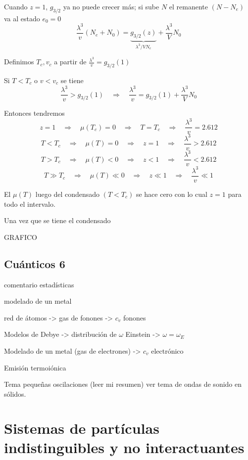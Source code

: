 \documentclass[10pt,oneside]{CBFT_book}
\begin{document}
Cuando $z=1$, $g_{3/2}$  ya no puede crecer más; si sube $N$ el remanente $(N-N_e)$ va al estado 
$e_0=0$
\[
	\frac{\lambda^3}{v}(N_e+N_0) = \underbrace{g_{3/2}(z)}_{\lambda^3/V N_e} + \frac{\lambda^3}{V} N_0
\]

Definimos $T_c, v_c$ a partir de $\frac{\lambda^3}{v} = g_{3/2}(1)$ 

Si $ T<T_c$ o $v<v_c$ se tiene 
\[
	\frac{\lambda^3}{v} > g_{3/2}(1) \quad \Rightarrow \quad \frac{\lambda^3}{v} =
	g_{3/2}(1) + \frac{\lambda^3}{V} N_0
\]

Entonces tendremos 
\[
	z = 1 \quad \Rightarrow \quad \mu(T_c) = 0 \quad \Rightarrow \quad T=T_c \quad \Rightarrow \quad  
	\frac{\lambda^3}{v} = 2.612
\]
\[
	T < T_c \quad \Rightarrow \quad \mu(T) = 0 \quad \Rightarrow \quad z = 1 \quad \Rightarrow \quad  
	\frac{\lambda^3}{v} > 2.612
\]
\[
	T > T_c \quad \Rightarrow \quad \mu(T) < 0 \quad \Rightarrow \quad z < 1 \quad \Rightarrow \quad  
	\frac{\lambda^3}{v} < 2.612
\]
\[
	T \gg T_c \quad \Rightarrow \quad \mu(T) \ll 0 \quad \Rightarrow \quad z \ll 1 \quad \Rightarrow \quad  
	\frac{\lambda^3}{v} \ll 1
\]

El $\mu(T)$ luego del condensado $(T<T_c)$ se hace cero con lo cual $z=1$ para todo el intervalo.

Una vez que se tiene el condensado

GRAFICO

\subsection{Cuánticos 6}

comentario estadísticas

modelado de un metal

red de átomos -> gas de fonones -> $c_v$ fonones

Modelos de Debye -> distribución de $\omega$
Einstein -> $\omega = \omega_E$

Modelado de un metal (gas de electrones) -> $c_v$ electrónico

Emisión termoiónica

Tema pequeñas oscilaciones (leer mi resumen)
ver tema de ondas de sonido en sólidos.


\section{Sistemas de partículas indistinguibles y no interactuantes}
\end{document}
